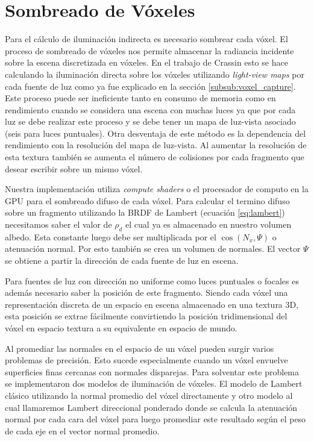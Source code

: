 \section{Sombreado de Vóxeles} %
\label{sec:sombreado_de_voxeles}
Para el cálculo de iluminación indirecta es necesario sombrear cada vóxel. El proceso de sombreado de vóxeles nos permite almacenar la radiancia incidente sobre la escena discretizada en vóxeles. En el trabajo de Crassin esto se hace calculando la iluminación directa sobre los vóxeles utilizando \emph{light-view maps} por cada fuente de luz como ya fue explicado en la sección \ref{subsub:voxel_capture}. Este proceso puede ser ineficiente tanto en consumo de memoria como en rendimiento cuando se considera una escena con muchas luces ya que por cada luz se debe realizar este proceso y se debe tener un mapa de luz-vista asociado (seis para luces puntuales). Otra desventaja de este método es la dependencia del rendimiento con la resolución del mapa de luz-vista. Al aumentar la resolución de esta textura también se aumenta el número de colisiones por cada fragmento que desear escribir sobre un mismo vóxel.

Nuestra implementación utiliza \emph{compute shaders} o el procesador de computo en la \ac{GPU} para el sombreado difuso de cada vóxel. Para calcular el termino difuso sobre un fragmento utilizando la \ac{BRDF} de Lambert (ecuación \ref{eq:lambert}) necesitamos saber el valor de $\rho_{d}$ el cual ya es almacenado en nuestro volumen albedo. Esta constante luego debe ser multiplicada por el $\cos(N_{x}, \Psi)$ o atenuación normal. Por esto también se crea un volumen de normales. El vector $\Psi$ se obtiene a partir la dirección de cada fuente de luz en escena.

Para fuentes de luz con dirección no uniforme como luces puntuales o focales es además necesario saber la posición de este fragmento. Siendo cada vóxel una representación discreta de un espacio en escena almacenado en una textura 3D, esta posición se extrae fácilmente convirtiendo la posición tridimensional del vóxel en espacio textura a su equivalente en espacio de mundo.

Al promediar las normales en el espacio de un vóxel pueden surgir varios problemas de precisión. Esto sucede especialmente cuando un vóxel envuelve superficies finas cercanas con normales disparejas. Para solventar este problema se implementaron dos modelos de iluminación de vóxeles. El modelo de Lambert clásico utilizando la normal promedio del vóxel directamente y otro modelo al cual llamaremos Lambert direccional ponderado donde se calcula la atenuación normal por cada cara del vóxel para luego promediar este resultado según el peso de cada eje en el vector normal promedio.

